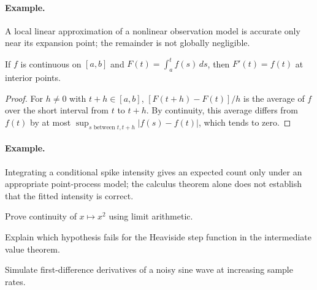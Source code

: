 \paragraph{Example.} A local linear approximation of a nonlinear observation model is accurate only near its expansion point; the remainder is not globally negligible.

\begin{theorem}If $f$ is continuous on $[a,b]$ and $F(t)=\int_a^t f(s)\,ds$, then $F'(t)=f(t)$ at interior points.\end{theorem}
\begin{proof}For $h\neq0$ with $t+h\in[a,b]$, $[F(t+h)-F(t)]/h$ is the average of $f$ over the short interval from $t$ to $t+h$. By continuity, this average differs from $f(t)$ by at most $\sup_{s\text{ between }t,t+h}|f(s)-f(t)|$, which tends to zero.\end{proof}
\paragraph{Example.} Integrating a conditional spike intensity gives an expected count only under an appropriate point-process model; the calculus theorem alone does not establish that the fitted intensity is correct.

\begin{exercises}
\item Prove continuity of $x\mapsto x^2$ using limit arithmetic.
\item Explain which hypothesis fails for the Heaviside step function in the intermediate value theorem.
\item Simulate first-difference derivatives of a noisy sine wave at increasing sample rates.
\end{exercises}